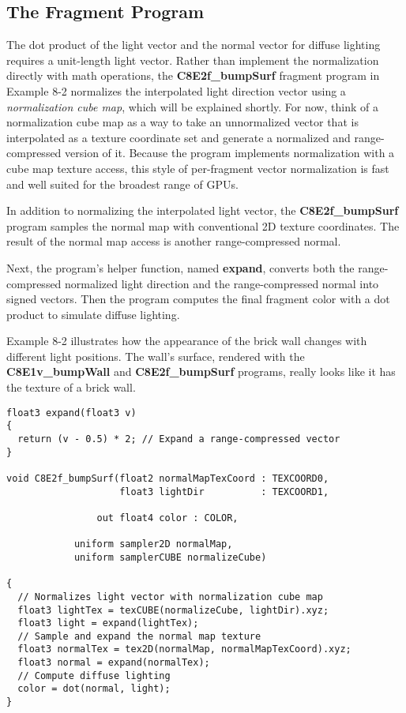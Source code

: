 \documentclass[../main.tex]{subfiles}
\begin{document}
\subsection*{The Fragment Program}

The dot product of the light vector and the normal vector for diffuse lighting requires a unit-length light vector. Rather than implement the normalization directly with math operations, the \textbf{C8E2f_bumpSurf} fragment program in Example 8-2 normalizes the interpolated light direction vector using a \textit{normalization cube map}, which will be explained shortly. For now, think of a normalization cube map as a way to take an unnormalized vector that is interpolated as a texture coordinate set and generate a normalized and range-compressed version of it. Because the program implements normalization with a cube map texture access, this style of per-fragment vector normalization is fast and well suited for the broadest range of GPUs.

In addition to normalizing the interpolated light vector, the \textbf{C8E2f_bumpSurf} program samples the normal map with conventional 2D texture coordinates. The result of the normal map access is another range-compressed normal.

Next, the program's helper function, named \textbf{expand}, converts both the range-compressed normalized light direction and the range-compressed normal into signed vectors. Then the program computes the final fragment color with a dot product to simulate diffuse lighting.

Example 8-2 illustrates how the appearance of the brick wall changes with different light positions. The wall's surface, rendered with the \textbf{C8E1v_bumpWall} and \textbf{C8E2f_bumpSurf} programs, really looks like it has the texture of a brick wall.

\FloatBarrier
\begin{lstlisting}[caption=Example 8-2. The \textbf{C8E2f_bumpSurf} Fragment Program]
float3 expand(float3 v)
{
  return (v - 0.5) * 2; // Expand a range-compressed vector
}

void C8E2f_bumpSurf(float2 normalMapTexCoord : TEXCOORD0,
                    float3 lightDir          : TEXCOORD1,

                out float4 color : COLOR,

            uniform sampler2D normalMap,
            uniform samplerCUBE normalizeCube)

{
  // Normalizes light vector with normalization cube map
  float3 lightTex = texCUBE(normalizeCube, lightDir).xyz;
  float3 light = expand(lightTex);
  // Sample and expand the normal map texture
  float3 normalTex = tex2D(normalMap, normalMapTexCoord).xyz;
  float3 normal = expand(normalTex);
  // Compute diffuse lighting
  color = dot(normal, light);
}
\end{lstlisting}
\FloatBarrier
\end{document}
